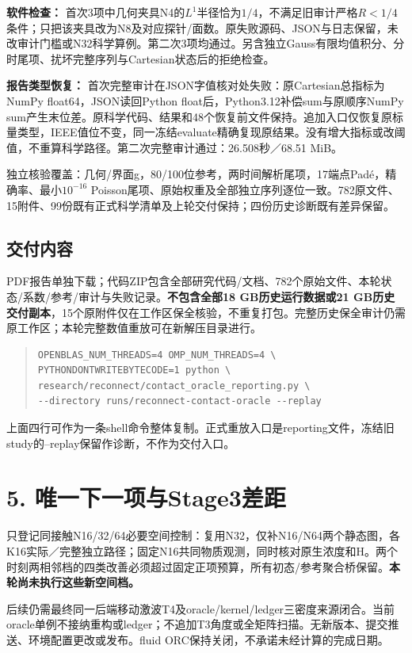 \documentclass[11pt,a4paper]{article}
\begin{document}
\textbf{软件检查：} 首次3项中几何夹具N4的$L^1$半径恰为$1/4$，不满足旧审计严格$R<1/4$条件；只把该夹具改为N8及对应探针/面数。原失败源码、JSON与日志保留，未改审计门槛或N32科学算例。第二次3项均通过。另含独立Gauss有限均值积分、分时尾项、扰坏完整序列与Cartesian状态后的拒绝检查。

\textbf{报告类型恢复：} 首次完整审计在JSON字值核对处失败：原Cartesian总指标为NumPy float64，JSON读回Python float后，Python3.12补偿sum与原顺序NumPy sum产生末位差。原科学代码、结果和48个恢复前文件保持。追加入口仅恢复原标量类型，IEEE值位不变，同一冻结evaluate精确复现原结果。没有增大指标或改阈值，不重算科学路径。第二次完整审计通过：26.508秒／68.51 MiB。

独立核验覆盖：几何/界面g，80/100位参考，两时间解析尾项，17端点Padé，精确率、最小$10^{-16}$ Poisson尾项、原始权重及全部独立序列逐位一致。782原文件、15附件、99份既有正式科学清单及上轮交付保持；四份历史诊断既有差异保留。

\subsection*{交付内容}
PDF报告单独下载；代码ZIP包含全部研究代码/文档、782个原始文件、本轮状态/系数/参考/审计与失败记录。\textbf{不包含全部18 GB历史运行数据或21 GB历史交付副本}，15个原附件仅在工作区保全核验，不重复打包。完整历史保全审计仍需原工作区；本轮完整数值重放可在新解压目录进行。

\begin{quote}\small
\begin{verbatim}
OPENBLAS_NUM_THREADS=4 OMP_NUM_THREADS=4 \
PYTHONDONTWRITEBYTECODE=1 python \
research/reconnect/contact_oracle_reporting.py \
--directory runs/reconnect-contact-oracle --replay
\end{verbatim}
\end{quote}
上面四行可作为一条shell命令整体复制。正式重放入口是reporting文件，冻结旧study的--replay保留作诊断，不作为交付入口。

\section*{5. 唯一下一项与Stage3差距}
只登记同接触N16/32/64必要空间控制：复用N32，仅补N16/N64两个静态图，各K16实际／完整独立路径；固定N16共同物质观测，同时核对原生浓度和H。两个时刻两相邻档的四类改善必须超过固定正项预算，所有初态/参考聚合桥保留。\textbf{本轮尚未执行这些新空间档。}

后续仍需最终同一后端移动激波T4及oracle/kernel/ledger三密度来源闭合。当前oracle单例不接纳重构或ledger；不追加T3角度或全矩阵扫描。无新版本、提交推送、环境配置更改或发布。fluid ORC保持关闭，不承诺未经计算的完成日期。
\end{document}
